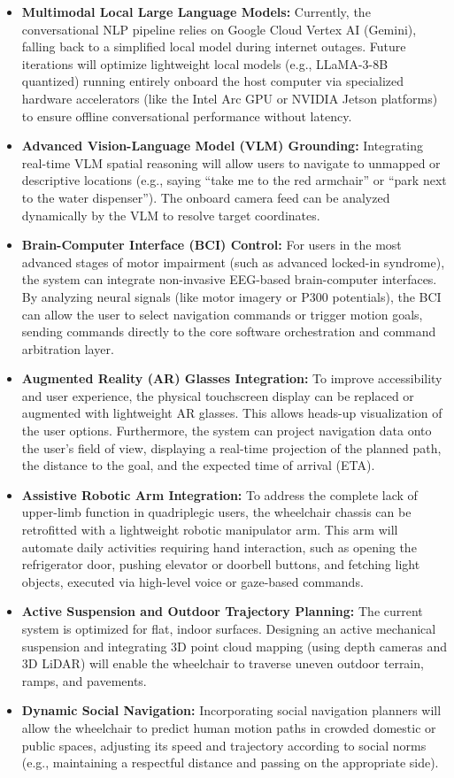 \begin{itemize}
    \item \textbf{Multimodal Local Large Language Models:} Currently, the conversational NLP pipeline relies on Google Cloud Vertex AI (Gemini), falling back to a simplified local model during internet outages. Future iterations will optimize lightweight local models (e.g., LLaMA-3-8B quantized) running entirely onboard the host computer via specialized hardware accelerators (like the Intel Arc GPU or NVIDIA Jetson platforms) to ensure offline conversational performance without latency.
    \item \textbf{Advanced Vision-Language Model (VLM) Grounding:} Integrating real-time VLM spatial reasoning will allow users to navigate to unmapped or descriptive locations (e.g., saying ``take me to the red armchair'' or ``park next to the water dispenser''). The onboard camera feed can be analyzed dynamically by the VLM to resolve target coordinates.
    \item \textbf{Brain-Computer Interface (BCI) Control:} For users in the most advanced stages of motor impairment (such as advanced locked-in syndrome), the system can integrate non-invasive EEG-based brain-computer interfaces. By analyzing neural signals (like motor imagery or P300 potentials), the BCI can allow the user to select navigation commands or trigger motion goals, sending commands directly to the core software orchestration and command arbitration layer.
    \item \textbf{Augmented Reality (AR) Glasses Integration:} To improve accessibility and user experience, the physical touchscreen display can be replaced or augmented with lightweight AR glasses. This allows heads-up visualization of the user options. Furthermore, the system can project navigation data onto the user's field of view, displaying a real-time projection of the planned path, the distance to the goal, and the expected time of arrival (ETA).
    \item \textbf{Assistive Robotic Arm Integration:} To address the complete lack of upper-limb function in quadriplegic users, the wheelchair chassis can be retrofitted with a lightweight robotic manipulator arm. This arm will automate daily activities requiring hand interaction, such as opening the refrigerator door, pushing elevator or doorbell buttons, and fetching light objects, executed via high-level voice or gaze-based commands.
    \item \textbf{Active Suspension and Outdoor Trajectory Planning:} The current system is optimized for flat, indoor surfaces. Designing an active mechanical suspension and integrating 3D point cloud mapping (using depth cameras and 3D LiDAR) will enable the wheelchair to traverse uneven outdoor terrain, ramps, and pavements.
    \item \textbf{Dynamic Social Navigation:} Incorporating social navigation planners will allow the wheelchair to predict human motion paths in crowded domestic or public spaces, adjusting its speed and trajectory according to social norms (e.g., maintaining a respectful distance and passing on the appropriate side).
\end{itemize}

